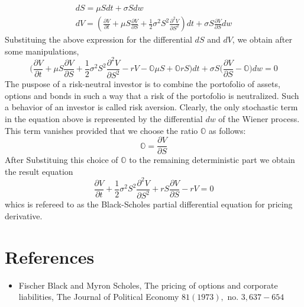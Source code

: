 \documentclass[a4paper]{article}
\begin{document}
\begin{equation}
    \begin{array}{l}
    {d S=\mu S d t+\sigma S d w} \\
    {d V=\left(\frac{\partial V}{\partial t}+\mu S \frac{\partial V}{\partial S}+\frac{1}{2} \sigma^{2} S^{2} \frac{\partial^{2} V}{\partial S^{2}}\right) d t+\sigma S \frac{\partial V}{\partial S} d w}
    \end{array}
\end{equation}
Substituing the above expression for the differential $dS$ and $dV$, we obtain after some manipulations,
\begin{equation}
    \bigg(\frac{\partial V}{\partial t}+\mu S \frac{\partial V}{\partial S}+\frac{1}{2} \sigma^{2} S^{2} \frac{\partial^{2} V}{\partial S^{2}}-r V- \mathbb{O}\mu S+ \mathbb{O}r S \bigg)  d t+  \sigma S\bigg(\frac{\partial V}{\partial S}- \mathbb{O} \bigg) d w=0
\end{equation}
The puspose of a risk-neutral investor is to combine the portofolio of assets, options and bonds in such a way that a risk of the portofolio is neutralized. Such a behavior of an investor is called risk aversion. Clearly, the only 
stochastic term in the equation above is represented by the differential $dw$ of the Wiener process. This term vanishes provided that we choose the ratio $\mathbb{O}$ as follows:
\begin{equation}
    \mathbb{O}=\frac{\partial V}{\partial S}
\end{equation}
After Substituing this choice of $\mathbb{O}$ to the remaining deterministic part we obtain the result equation
\begin{equation}
    \frac{\partial V}{\partial t}+\frac{1}{2} \sigma^{2} S^{2} \frac{\partial^{2} V}{\partial S^{2}}+r S \frac{\partial V}{\partial S}-r V=0
\end{equation}
whics is refereed to as the Black-Scholes partial differential equation for pricing derivative.
\section{References}
\begin{itemize}
    \item Fischer Black and Myron Scholes, The pricing of options and corporate liabilities, The Journal of Political Economy $81(1973),$ no. $3,637-654$
\end{itemize}
\end{document}
